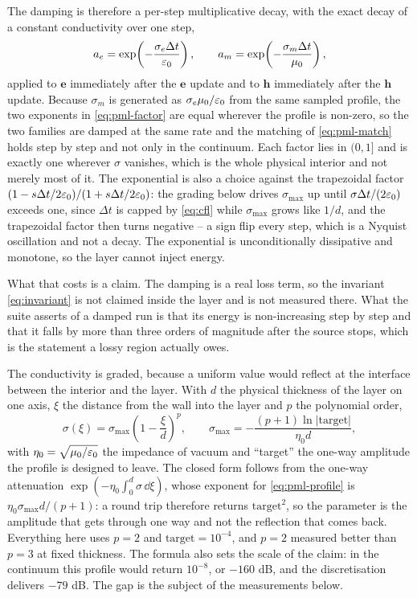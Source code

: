 The damping is therefore a per-step multiplicative decay, with the exact decay of a constant conductivity over
one step,
\begin{equation}
  a_e = \exp\!\left(-\frac{\sigma_e\Delta t}{\varepsilon_0}\right), \qquad
  a_m = \exp\!\left(-\frac{\sigma_m\Delta t}{\mu_0}\right),
  \label{eq:pml-factor}
\end{equation}
applied to $\mathbf{e}$ immediately after the $\mathbf{e}$ update and to $\mathbf{h}$ immediately after the
$\mathbf{h}$ update. Because $\sigma_m$ is generated as $\sigma_e\mu_0/\varepsilon_0$ from the same sampled profile,
the two exponents in \eqref{eq:pml-factor} are equal wherever the profile is non-zero, so the two families are
damped at the same rate and the matching of \eqref{eq:pml-match} holds step by step and not only in the
continuum. Each factor lies in $(0,1]$ and is exactly one wherever $\sigma$ vanishes, which is the whole
physical interior and not merely most of it. The exponential is also a choice against the trapezoidal factor
$(1-s\Delta t/2\varepsilon_0)/(1+s\Delta t/2\varepsilon_0)$: the grading below drives $\sigma_{\max}$ up until
$\sigma\Delta t/(2\varepsilon_0)$ exceeds one, since $\Delta t$ is capped by \eqref{eq:cfl} while $\sigma_{\max}$
grows like $1/d$, and the trapezoidal factor then turns negative -- a sign flip every step, which is a Nyquist
oscillation and not a decay. The exponential is unconditionally dissipative and monotone, so the layer cannot
inject energy.

What that costs is a claim. The damping is a real loss term, so the invariant \eqref{eq:invariant} is not
claimed inside the layer and is not measured there. What the suite asserts of a damped run is that its energy
is non-increasing step by step and that it falls by more than three orders of magnitude after the source stops,
which is the statement a lossy region actually owes.

The conductivity is graded, because a uniform value would reflect at the interface between the interior and the
layer. With $d$ the physical thickness of the layer on one axis, $\xi$ the distance from the wall into the
layer and $p$ the polynomial order,
\begin{equation}
  \sigma(\xi) = \sigma_{\max}\left(1-\frac{\xi}{d}\right)^{p}, \qquad
  \sigma_{\max} = -\frac{(p+1)\ln|\mathrm{target}|}{\eta_0 d},
  \label{eq:pml-profile}
\end{equation}
with $\eta_0=\sqrt{\mu_0/\varepsilon_0}$ the impedance of vacuum and ``target'' the one-way amplitude the profile is
designed to leave. The closed form follows from the one-way attenuation $\exp(-\eta_0\int_0^d\sigma\,\dd\xi)$,
whose exponent for \eqref{eq:pml-profile} is $\eta_0\sigma_{\max}d/(p+1)$: a round trip therefore returns
$\mathrm{target}^2$, so the parameter is the amplitude that gets through one way and not the reflection that
comes back. Everything here uses $p=2$ and $\mathrm{target}=10^{-4}$, and $p=2$ measured better than $p=3$ at
fixed thickness. The formula also sets the scale of the claim: in the continuum this profile would return
$10^{-8}$, or $-160$ dB, and the discretisation delivers $-79$ dB. The gap is the subject of the measurements
below.

